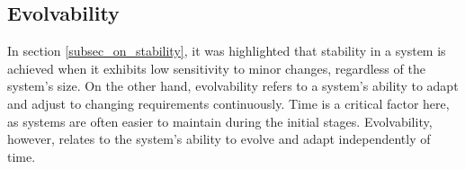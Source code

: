 \subsection{Evolvability} \label{sec_on_evolvability}

In section \ref{subsec_on_stability}, it was highlighted that stability in a system is
achieved when it exhibits low sensitivity to minor changes, regardless of the system's
size. On the other hand, evolvability refers to a system's ability to adapt and adjust to
changing requirements continuously. Time is a critical factor here, as systems are often
easier to maintain during the initial stages. Evolvability, however, relates to the
system's ability to evolve and adapt independently of time.